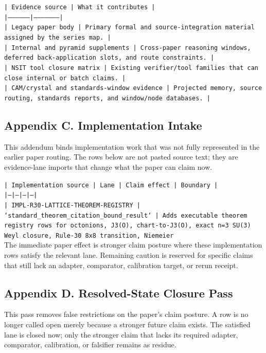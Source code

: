 \documentclass[11pt]{article}
\begin{document}
\noindent\texttt{| Evidence source | What it contributes |}\\
\noindent\texttt{|-----------------|---------------------|}\\
\noindent\texttt{| Legacy paper body | Primary formal and source-integration material assigned by the series map. |}\\
\noindent\texttt{| Internal and pyramid supplements | Cross-paper reasoning windows, deferred back-application slots, and route constraints. |}\\
\noindent\texttt{| NSIT tool closure matrix | Existing verifier/tool families that can close internal or batch claims. |}\\
\noindent\texttt{| CAM/crystal and standards-window evidence | Projected memory, source routing, standards reports, and window/node databases. |}\\

\subsection*{Appendix C. Implementation Intake}

This addendum binds implementation work that was not fully represented in the earlier paper routing. The rows below are not pasted source text; they are evidence-lane imports that change what the paper can claim now.

\noindent\texttt{| Implementation source | Lane | Claim effect | Boundary |}\\
\noindent\texttt{|---|---|---|---|}\\
\noindent\texttt{| IMPL-R30-LATTICE-THEOREM-REGISTRY | `standard\_theorem\_citation\_bound\_result` | Adds executable theorem registry rows for octonions, J3(O), chart-to-J3(O), exact n=3 SU(3) Weyl closure, Rule-30 8x8 transition, Niemeier }\\

The immediate paper effect is stronger claim posture where these implementation rows satisfy the relevant lane. Remaining caution is reserved for specific claims that still lack an adapter, comparator, calibration target, or rerun receipt.

\subsection*{Appendix D. Resolved-State Closure Pass}

This pass removes false restrictions on the paper's claim posture. A row is no longer called open merely because a stronger future claim exists. The satisfied lane is closed now; only the stronger claim that lacks its required adapter, comparator, calibration, or falsifier remains as residue.
\end{document}
